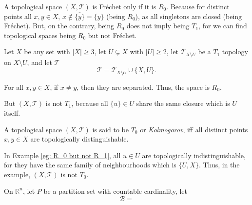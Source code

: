 \begin{note}
	A topological space $(X, \mathcal T)$ is Fr\'echet only if it is $R_0$. Because for distinct points all $x,y \in X$, $x \notin \overline{\{y\}} = \{y\}$ (being $R_0$), as all singletons are closed (being Fr\'echet). But, on the contrary, being $R_0$ does not imply being $T_1$, for we can find topological spaces being $R_0$ but not Fr\'echet.
\end{note}


\begin{example}
	\label{eg: R_0 but not T_1}
	
	Let $X$ be any set with $|X| \ge 3$, let $U \subsetneq X$ with $|U| \ge 2$, let $\mathcal T_{X \setminus U}$ be a $T_1$ topology on $X \setminus U$, and let $\mathcal T$
	$$
	\mathcal T = \mathcal T_{X \setminus U} \cup \{X, U\}.
	$$
	
	For all $x,y \in X$, if $x \ne y$, then they are separated. Thus, the space is $R_0$.
	
	But $(X, \mathcal T)$ is not $T_1$, because all $\{u\} \in U$ share the same closure which is $U$ itself.
\end{example}


\begin{definition}
	[$T_0$ spaces]
	\label{def: T_1 spaces}
	A topological space $(X, \mathcal T)$ is said to be $T_0$ or \textit{Kolmogorov}, iff all distinct points $x,y \in X$ are topologically distinguishable.
\end{definition}


\begin{note}
	In Example \ref{eg: R_0 but not R_1}, all $u \in U$ are topologically indistinguishable, for they have the same family of neighbourhoods which is $\{U, X\}$. Thus, in the example, $(X, \mathcal T)$ is not $T_0$.
\end{note}


\begin{example}
	On $\mathbb R^n$, let $P$ be a partition set with countable cardinality, let
	$$
	\mathcal B = 
	$$
	
\end{example}


